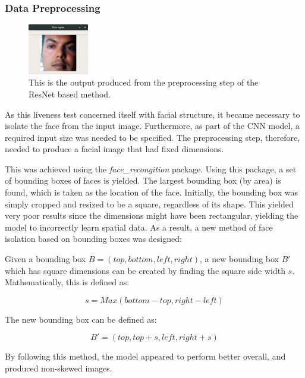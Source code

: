 \documentclass[12pt,a4paper]{article}
\begin{document}
            \subsubsection{Data Preprocessing}
            \begin{figure}
                \centering
                \includegraphics[width=100px]{FaceExtraction.png}
                \caption{This is the output produced from the preprocessing step of the ResNet based method.}
                \label{FaceExtraction}
            \end{figure}
            
            As this liveness test concerned itself with facial structure, it became necessary to isolate the face from the input image. Furthermore, as part of the CNN model, a required input size was needed to be specified. 
            The preprocessing step, therefore, needed to produce a facial image that had fixed dimensions.

            This was achieved using the \emph{face\_recongition} package. Using this package, a set of bounding boxes of faces is yielded. The largest bounding box (by area) is found, which is taken as the location of the face. Initially, the bounding box was simply cropped and resized to be a square, regardless of its shape. This yielded very poor results  since the dimensions might have been rectangular, yielding the model to incorrectly learn spatial data. As a result, a new method of face isolation based on bounding boxes was designed:
            
            Given a bounding box $B = (top, bottom, left, right)$, a new bounding box $B'$ which has square dimensions can be created by finding the square
            side width $s$. Mathematically, this is defined as:

                $$s = Max(bottom - top, right - left)$$


                The new bounding box can be defined as:


                $$B' = (top, top + s, left, right + s)$$


                By following this method, the model appeared to perform better overall, and produced non-skewed images.
\end{document}
